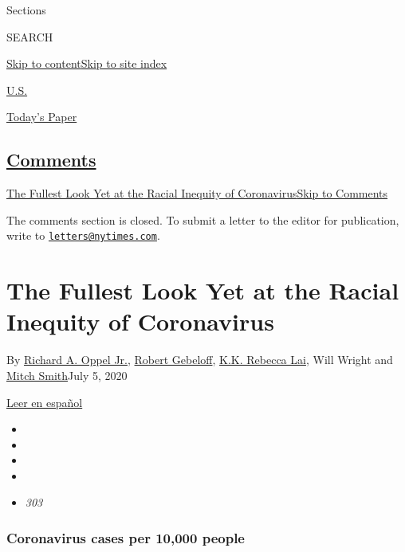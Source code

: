 Sections

SEARCH

\protect\hyperlink{site-content}{Skip to
content}\protect\hyperlink{site-index}{Skip to site index}

\href{https://www.nytimes.com/section/us}{U.S.}

\href{https://myaccount.nytimes.com/auth/login?response_type=cookie\&client_id=vi}{}

\href{https://www.nytimes.com/section/todayspaper}{Today's Paper}

\hypertarget{comments}{%
\subsection{\texorpdfstring{\protect\hyperlink{commentsContainer}{Comments}}{Comments}}\label{comments}}

\href{}{The Fullest Look Yet at the Racial Inequity of
Coronavirus}\href{}{Skip to Comments}

The comments section is closed. To submit a letter to the editor for
publication, write to
\href{mailto:letters@nytimes.com}{\nolinkurl{letters@nytimes.com}}.

\hypertarget{the-fullest-look-yet-at-the-racial-inequity-of-coronavirus}{%
\section{The Fullest Look Yet at the Racial Inequity of
Coronavirus}\label{the-fullest-look-yet-at-the-racial-inequity-of-coronavirus}}

By \href{https://www.nytimes.com/by/richard-a-oppel-jr}{Richard A. Oppel
Jr.}, \href{https://www.nytimes.com/by/robert-gebeloff}{Robert
Gebeloff}, \href{https://www.nytimes.com/by/kk-rebecca-lai}{K.K. Rebecca
Lai}, Will Wright and
\href{https://www.nytimes.com/by/mitch-smith}{Mitch Smith}July 5, 2020

\href{https://www.nytimes.com/es/interactive/2020/07/09/espanol/mundo/coronavirus-latinos-africanoamericanos-datos.html}{Leer
en español}

\begin{itemize}
\item
\item
\item
\item
\item
  \emph{303}
\end{itemize}

\hypertarget{coronavirus-cases-per-10000-people}{%
\subsubsection{Coronavirus cases per 10,000
people}\label{coronavirus-cases-per-10000-people}}

